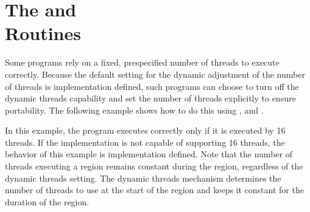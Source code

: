 \pagebreak
\section{The  and \\
 Routines}
\label{sec:set_dynamic_nthrs}

Some programs rely on a fixed, prespecified number of threads to execute correctly. 
Because the default setting for the dynamic adjustment of the number of threads 
is implementation defined, such programs can choose to turn off the dynamic threads 
capability and set the number of threads explicitly to ensure portability. The 
following example shows how to do this using , and .

In this example, the program executes correctly only if it is executed by 16 threads. 
If the implementation is not capable of supporting 16 threads, the behavior of 
this example is implementation defined. Note that the number of threads executing 
a  region remains constant during the region, regardless of the 
dynamic threads setting. The dynamic threads mechanism determines the number of 
threads to use at the start of the  region and keeps it constant 
for the duration of the region.




